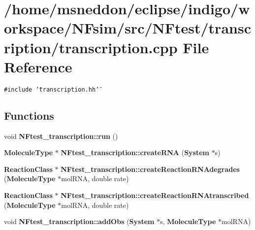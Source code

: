 \section{/home/msneddon/eclipse/indigo/workspace/NFsim/src/NFtest/transcription/transcription.cpp File Reference}
\label{transcription_8cpp}


{\tt \#include \char`\"{}transcription.hh\char`\"{}}\par
\subsection*{Functions}
\begin{CompactItemize}
\item 
void {\bf NFtest\_\-transcription::run} ()
\item 
{\bf MoleculeType} $\ast$ {\bf NFtest\_\-transcription::createRNA} ({\bf System} $\ast$s)
\item 
{\bf ReactionClass} $\ast$ {\bf NFtest\_\-transcription::createReactionRNAdegrades} ({\bf MoleculeType} $\ast$molRNA, double rate)
\item 
{\bf ReactionClass} $\ast$ {\bf NFtest\_\-transcription::createReactionRNAtranscribed} ({\bf MoleculeType} $\ast$molRNA, double rate)
\item 
void {\bf NFtest\_\-transcription::addObs} ({\bf System} $\ast$s, {\bf MoleculeType} $\ast$molRNA)
\end{CompactItemize}
